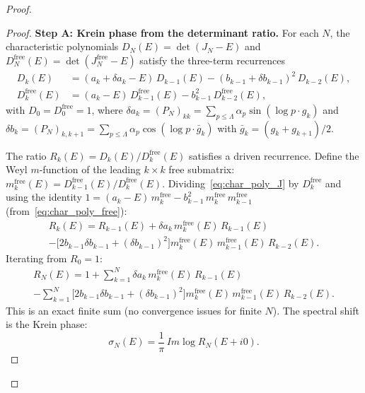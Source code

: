 \documentclass{pre-aomart}
\def\Im{Im}%
\theoremstyle{plain}
\theoremstyle{definition}
\theoremstyle{remark}
\begin{document}
\begin{proof}
\begin{proof}
\textbf{Step A: Krein phase from the determinant ratio.}
For each $N$, the characteristic polynomials
$D_N(E) = \det(J_N - E)$ and $D_N^{\mathrm{free}}(E) = \det(J_N^{\mathrm{free}} - E)$
satisfy the three-term recurrences
\begin{align}
D_k(E) &= (a_k + \delta a_k - E)\,D_{k-1}(E)
         - (b_{k-1} + \delta b_{k-1})^2\,D_{k-2}(E), \label{eq:char_poly_J}\\
D_k^{\mathrm{free}}(E) &= (a_k - E)\,D_{k-1}^{\mathrm{free}}(E)
         - b_{k-1}^2\,D_{k-2}^{\mathrm{free}}(E), \label{eq:char_poly_free}
\end{align}
with $D_0 = D_0^{\mathrm{free}} = 1$,
where $\delta a_k = (P_N)_{kk} = \sum_{p \le \Lambda}\alpha_p\sin(\log p \cdot g_k)$
and $\delta b_k = (P_N)_{k,k+1} = \sum_{p \le \Lambda}\alpha_p\cos(\log p \cdot \bar{g}_k)$
with $\bar{g}_k = (g_k + g_{k+1})/2$.

The ratio $R_k(E) = D_k(E)/D_k^{\mathrm{free}}(E)$ satisfies a driven recurrence.
Define the Weyl $m$-function of the leading $k \times k$ free submatrix:
$m_k^{\mathrm{free}}(E) = D_{k-1}^{\mathrm{free}}(E)/D_k^{\mathrm{free}}(E)$.
Dividing~\eqref{eq:char_poly_J} by $D_k^{\mathrm{free}}$ and using the identity
$1 = (a_k - E)\,m_k^{\mathrm{free}} - b_{k-1}^2\,m_k^{\mathrm{free}}\,m_{k-1}^{\mathrm{free}}$
(from~\eqref{eq:char_poly_free}):
\begin{multline}\label{eq:ratio_recurrence}
R_k(E) = R_{k-1}(E)
  + \delta a_k\,m_k^{\mathrm{free}}(E)\,R_{k-1}(E)\\
  - \bigl[2b_{k-1}\delta b_{k-1} + (\delta b_{k-1})^2\bigr]
    m_k^{\mathrm{free}}(E)\,m_{k-1}^{\mathrm{free}}(E)\,R_{k-2}(E).
\end{multline}
Iterating from $R_0 = 1$:
\begin{multline}\label{eq:det_ratio_expansion}
R_N(E) = 1 + \sum_{k=1}^{N}\delta a_k\,m_k^{\mathrm{free}}(E)\,R_{k-1}(E)\\
  - \sum_{k=1}^{N}\bigl[2b_{k-1}\delta b_{k-1} + (\delta b_{k-1})^2\bigr]
    m_k^{\mathrm{free}}(E)\,m_{k-1}^{\mathrm{free}}(E)\,R_{k-2}(E).
\end{multline}
This is an exact finite sum (no convergence issues for finite $N$).
The spectral shift is the Krein phase:
\begin{equation}\label{eq:krein_phase}
\sigma_N(E) = \frac{1}{\pi}\,\Im\log R_N(E + i0).
\end{equation}


\end{proof}
\end{proof}
\end{document}
